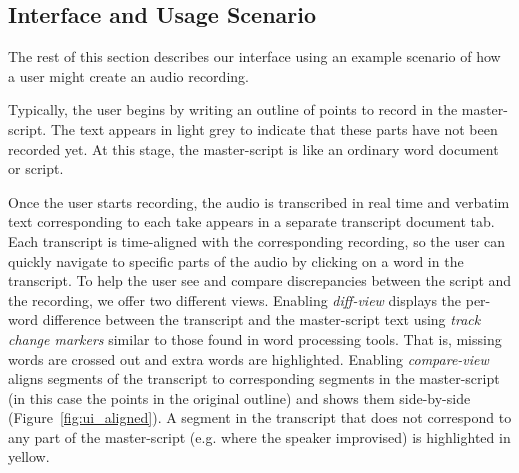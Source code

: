 
\subsection{Interface and Usage Scenario}
The rest of this section describes our interface using an example scenario of how a user might create an audio recording. 

Typically, the user begins by writing an outline of points to record in the master-script.
The text appears in light grey to indicate that these parts have not been recorded yet. At this stage, the master-script is like an ordinary word document or script. 

Once the user starts recording, the audio is transcribed in real time and verbatim text corresponding to each take appears in a separate transcript document tab. Each transcript is time-aligned with the corresponding recording, so the user can quickly navigate to specific
parts of the audio by clicking on a word in the transcript. To help the user see and compare discrepancies between the script and the recording, we offer two different views.
Enabling \textit{diff-view} displays the per-word difference between the transcript and the master-script text using  \textit{track change markers} similar to those found in word processing tools. That is, missing words are crossed out and extra words are highlighted. Enabling \textit{compare-view} aligns segments of the transcript to corresponding segments in the master-script (in this case the points in the original outline) and shows them side-by-side (Figure~\ref{fig:ui_aligned}). A segment in the transcript that does not correspond to any part of the master-script (e.g. where the speaker improvised) is highlighted in yellow.

